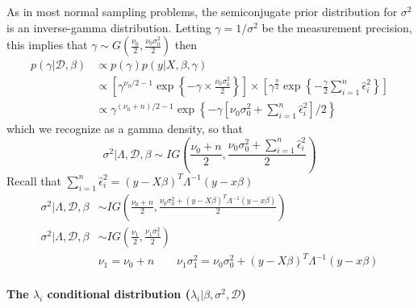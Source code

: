 \documentclass[
]{article}
\begin{document}
As in most normal sampling problems, the semiconjugate prior
distribution for \(\sigma^2\) is an inverse-gamma distribution. Letting
\(\gamma = 1/\sigma^2\) be the measurement precision, this implies that
\(\gamma \sim G\left(\frac{\nu_0}{2}, \frac{\nu_0\sigma_0^2}{2}\right)\)
then \[
\begin{align}
p(\gamma | \mathcal{D}, \beta) & \propto p(\gamma) p(y | X, \beta, \gamma) \\
& \propto\left[\gamma^{\nu_{0} / 2-1} \exp \left\{-\gamma \times \frac{ \nu_{0} \sigma_{0}^{2}}{2}\right\}\right] \times\left[\gamma^{\frac{n}{2}} \exp \left\{- \frac{\gamma  }{2} \sum_{i=1}^{n} \hat\epsilon_i^2\right\}\right] \\
& \propto\gamma^{\left(\nu_{0}+n\right) / 2-1} \exp \left\{-\gamma\left[\nu_{0} \sigma_{0}^{2}+\sum_{i=1}^{n} \hat\epsilon_i^2\right] / 2\right\}
\end{align}
\] which we recognize as a gamma density, so that \[
\sigma^2| \Lambda, \mathcal{D}, \beta \sim IG\left(\frac{\nu_0 + n}{2}, \frac{\nu_0 \sigma_0^2 + \sum_{i=1}^{n} \hat\epsilon_i^2}{2}\right)
\] Recall that
\(\sum_{i=1}^{n} \hat\epsilon_i^2 = (y - X\beta)^T\Lambda^{-1}(y-x\beta)\)
\[
\begin{align}
\sigma^2| \Lambda, \mathcal{D}, \beta &\sim IG\left(\frac{\nu_0 + n}{2}, \frac{\nu_0 \sigma_0^2 + (y - X\beta)^T\Lambda^{-1}(y-x\beta)}{2}\right) \\
\sigma^2| \Lambda, \mathcal{D}, \beta &\sim IG\left(\frac{\nu_1}{2}, \frac{\nu_1 \sigma_1^2}{2}\right) \\
&\nu_1 = \nu_0 + n \qquad \nu_1\sigma_1^2 = \nu_0\sigma_0^2 + (y - X\beta)^T\Lambda^{-1}(y-x\beta)
\end{align}
\]

\hypertarget{the-lambda_i-conditional-distribution-lambda_i-beta-sigma2-mathcald}{%
\paragraph{\texorpdfstring{The \(\lambda_{i}\) conditional distribution
(\(\lambda_{i} | \beta, \sigma^{2}, \mathcal{D}\))}{The \textbackslash lambda\_\{i\} conditional distribution (\textbackslash lambda\_\{i\} \textbar{} \textbackslash beta, \textbackslash sigma\^{}\{2\}, \textbackslash mathcal\{D\})}}\label{the-lambda_i-conditional-distribution-lambda_i-beta-sigma2-mathcald}}
\end{document}
